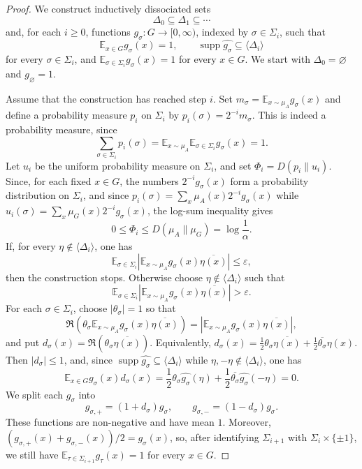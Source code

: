 \documentclass[11pt,reqno]{amsart}
\theoremstyle{plain}
\theoremstyle{remark}
\begin{document}
\begin{proof}
We construct inductively dissociated sets
$$
\Delta_0\subseteq \Delta_1\subseteq \cdots
$$
and, for each $i\ge 0$, functions $g_\sigma:G\to[0,\infty)$, indexed by
$\sigma\in\Sigma_i$, such that
$$
\mathbb E_{x\in G}g_\sigma(x)=1,
\qquad
\operatorname{supp}\widehat{g_\sigma}\subseteq \langle\Delta_i\rangle
$$
for every $\sigma\in\Sigma_i$, and
$\mathbb E_{\sigma\in\Sigma_i}g_\sigma(x)=1$ for every $x\in G$. We start with
$\Delta_0=\varnothing$ and $g_\varnothing=1$.

Assume that the construction has reached step $i$. Set
$m_\sigma=\mathbb E_{x\sim\mu_A}g_\sigma(x)$ and define a probability measure
$p_i$ on $\Sigma_i$ by $p_i(\sigma)=2^{-i}m_\sigma$. This is indeed a
probability measure, since
$$
\sum_{\sigma\in\Sigma_i}p_i(\sigma)
=
\mathbb E_{x\sim\mu_A}\mathbb E_{\sigma\in\Sigma_i}g_\sigma(x)
=
1.
$$
Let $u_i$ be the uniform probability measure on $\Sigma_i$, and set
$\Phi_i=D(p_i\|u_i)$. Since, for each fixed $x\in G$, the numbers
$2^{-i}g_\sigma(x)$ form a probability distribution on $\Sigma_i$, and since
$p_i(\sigma)=\sum_x\mu_A(x)2^{-i}g_\sigma(x)$ while
$u_i(\sigma)=\sum_x\mu_G(x)2^{-i}g_\sigma(x)$, the log-sum inequality gives
$$
0\le \Phi_i\le D(\mu_A\|\mu_G)=\log\frac1\alpha.
$$
If, for every $\eta\notin\langle\Delta_i\rangle$, one has
$$
\mathbb E_{\sigma\in\Sigma_i}
\left|
\mathbb E_{x\sim\mu_A}g_\sigma(x)\overline{\eta(x)}
\right|
\le \varepsilon,
$$
then the construction stops. Otherwise choose $\eta\notin\langle\Delta_i\rangle$
such that
$$
\mathbb E_{\sigma\in\Sigma_i}
\left|
\mathbb E_{x\sim\mu_A}g_\sigma(x)\overline{\eta(x)}
\right|
>
\varepsilon.
$$
For each $\sigma\in\Sigma_i$, choose $|\theta_\sigma|=1$ so that
$$
\Re\left(
\theta_\sigma
\mathbb E_{x\sim\mu_A}g_\sigma(x)\overline{\eta(x)}
\right)
=
\left|
\mathbb E_{x\sim\mu_A}g_\sigma(x)\overline{\eta(x)}
\right|,
$$
and put
$
d_\sigma(x)=\Re(\theta_\sigma\overline{\eta(x)}).
$
Equivalently,
$
d_\sigma(x)
=
\frac12\theta_\sigma\overline{\eta(x)}
+
\frac12\overline{\theta_\sigma}\eta(x).
$
Then $|d_\sigma|\le 1$, and, since
$\operatorname{supp}\widehat{g_\sigma}\subseteq\langle\Delta_i\rangle$ while
$\eta,-\eta\notin\langle\Delta_i\rangle$, one has
$$
\mathbb E_{x\in G}g_\sigma(x)d_\sigma(x)
=
\frac12\theta_\sigma\widehat{g_\sigma}(\eta)
+
\frac12\overline{\theta_\sigma}\widehat{g_\sigma}(-\eta)
=
0.
$$
We split each $g_\sigma$ into
$$
g_{\sigma,+}=(1+d_\sigma)g_\sigma,
\qquad
g_{\sigma,-}=(1-d_\sigma)g_\sigma.
$$
These functions are non-negative and have mean $1$. Moreover,
$(g_{\sigma,+}(x)+g_{\sigma,-}(x))/2=g_\sigma(x)$, so, after identifying
$\Sigma_{i+1}$ with $\Sigma_i\times\{\pm1\}$, we still have
$\mathbb E_{\tau\in\Sigma_{i+1}}g_\tau(x)=1$ for every $x\in G$.


\end{proof}
\end{document}
